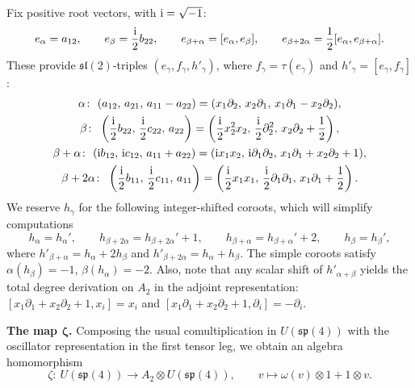 \documentclass[10pt,a4paper]{amsart}
\numberwithin{equation}{section}
\begin{document}
Fix positive root vectors, with
${\rm i}=\sqrt{-1}$:
\begin{align*}
	e_{\alpha} = a_{12}, \qquad e_{\beta} = \frac{{\rm i}}{2}b_{22},\qquad
	e_{\beta+\alpha} =[e_{\alpha},e_\beta],\qquad e_{\beta+2\alpha}=\frac{1}{2}[e_\alpha,e_{\beta+\alpha}].
\end{align*}
These provide $\mathfrak{sl}(2)$-triples $(e_{\gamma},f_{\gamma},h'_{\gamma})$, where $f_{\gamma}=\tau(e_{\gamma})$ and $h'_{\gamma}=[e_{\gamma},f_{\gamma}]$:
\begin{gather*}
		\alpha\colon\ (a_{12},\thinspace a_{21},\thinspace a_{11} - a_{22}) = (x_{1}\partial_{2},\thinspace x_{2}\partial_{1},\thinspace x_{1}\partial_{1}-x_{2}\partial_{2}),\\
		\beta\colon\ \left(\frac{\rm i}{2}b_{22},\thinspace \frac{\rm i}{2}c_{22},\thinspace a_{22}\right) = \left(\frac{\rm i}{2}x^{2}_{2}x_{2},\thinspace \frac{\rm i}{2}\partial^{2}_{2},\thinspace x_{2}\partial_{2} + \frac{1}{2}\right),\\
		\beta + \alpha\colon\ ({\rm i} b_{12},\thinspace {\rm i} c_{12},\thinspace a_{11} + a_{22}) = ({\rm i}x_{1}x_{2},\thinspace {\rm i}\partial_{1}\partial_{2},\thinspace x_{1}\partial_{1} + x_{2}\partial_{2} + 1),\\
		\beta + 2\alpha\colon\ \left(\frac{\rm i}{2}b_{11},\thinspace \frac{\rm i}{2}c_{11},\thinspace a_{11}\right) = \left(\frac{\rm i}{2}x_{1}x_{1},\thinspace \frac{\rm i}{2}\partial_{1}\partial_{1},\thinspace x_{1}\partial_{1} + \frac{1}{2}\right).
\end{gather*}
We reserve $h_\gamma$ for the following integer-shifted coroots,
which will simplify computations
\[%
	h_\alpha = h_\alpha',\qquad h_{\beta+2\alpha}=h_{\beta+2\alpha}'+1,\qquad h_{\beta+\alpha}=h_{\beta+\alpha}'+2,\qquad h_\beta=h_\beta',
\]
where $h'_{\beta+\alpha} = h_{\alpha} + 2h_{\beta}$ and $h'_{\beta+2\alpha} = h_{\alpha} + h_{\beta}$.
The simple coroots satisfy $\alpha(h_{\beta})=-1$, $\beta(h_{\alpha})=-2$.
Also, note that any scalar shift of $h'_{\alpha+\beta}$ yields the total degree derivation on $A_{2}$ in the adjoint representation:
$[x_{1}\partial_{1} + x_{2}\partial_{2} + 1, x_i]=x_i$ and $[x_{1}\partial_{1} + x_{2}\partial_{2} + 1, \partial_i]=-\partial_i$.


{\bf The map $\boldsymbol{\zeta}$.}
Composing the usual comultiplication in $U(\mathfrak{sp}(4))$ with the oscillator representation in the first tensor leg, we obtain an algebra homomorphism
\begin{equation}\label{eq:Homomorphism-sp4toA}
	\zeta\colon\ U(\mathfrak{sp}(4)) \rightarrow A_{2}\otimes U(\mathfrak{sp}(4)),\qquad v\mapsto \omega(v)\otimes 1+1\otimes v.
\end{equation}
\end{document}
